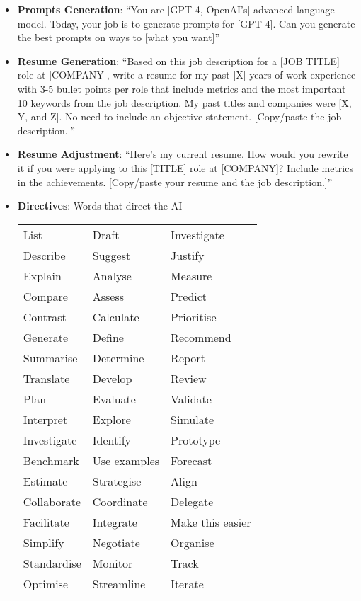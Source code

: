 \begin{itemize}
\itemsep-0.25em %
\item \textbf{Prompts Generation}: ``You are [GPT-4, OpenAI’s] advanced language model. Today, your job is to generate prompts for [GPT-4]. Can you generate the best prompts on ways to [what you want]''

\item \textbf{Resume Generation}: ``Based on this job description for a [JOB TITLE] role at [COMPANY], write a resume for my past [X] years of work experience with 3-5 bullet points per role that include metrics and the most important 10 keywords from the job description. My past titles and companies were [X, Y, and Z]. No need to include an objective statement. [Copy/paste the job description.]''

\item \textbf{Resume Adjustment}: ``Here's my current resume. How would you rewrite it if you were applying to this [TITLE] role at [COMPANY]? Include metrics in the achievements. [Copy/paste your resume and the job description.]''

\item \textbf{Directives}: Words that direct the AI
\begin{tabular}{lll}
List           & Draft           & Investigate \\
Describe       & Suggest         & Justify \\
Explain        & Analyse         & Measure \\
Compare        & Assess          & Predict \\
Contrast       & Calculate       & Prioritise \\
Generate       & Define          & Recommend \\
Summarise      & Determine       & Report \\
Translate      & Develop         & Review \\
Plan           & Evaluate        & Validate \\
Interpret      & Explore         & Simulate \\
Investigate    & Identify        & Prototype \\
Benchmark      & Use examples    & Forecast \\
Estimate       & Strategise      & Align \\
Collaborate    & Coordinate      & Delegate \\
Facilitate     & Integrate       & Make this easier \\
Simplify       & Negotiate       & Organise \\
Standardise    & Monitor         & Track \\
Optimise       & Streamline      & Iterate \\
\end{tabular}
 
\end{itemize}


